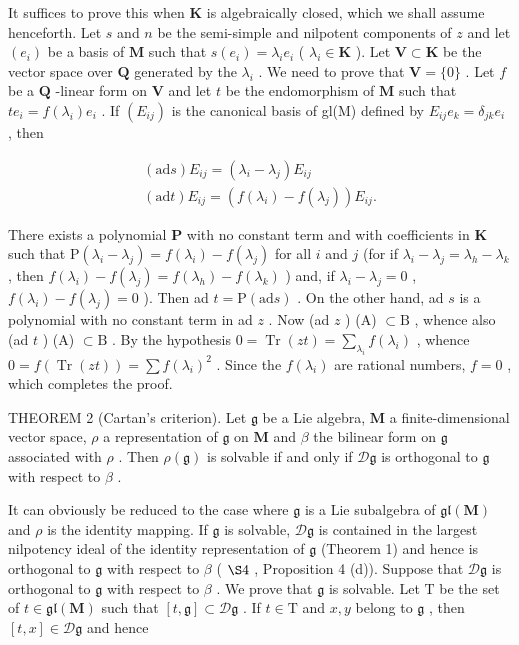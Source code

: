 It suffices to prove this when \(\mathbf{K}\) is algebraically closed, which we shall assume henceforth. Let \(s\) and \(n\) be the semi-simple and nilpotent components of \(z\) and let \((e_i)\) be a basis of \(\mathbf{M}\) such that \(s(e_i) = \lambda_i e_i\) ( \(\lambda_i \in \mathbf{K}\) ). Let \(\mathbf{V} \subset \mathbf{K}\) be the vector space over \(\mathbf{Q}\) generated by the \(\lambda_i\) . We need to prove that \(\mathbf{V} = \{0\}\) . Let \(f\) be a \(\mathbf{Q}\) -linear form on \(\mathbf{V}\) and let \(t\) be the endomorphism of \(\mathbf{M}\) such that \(te_{i}=f(\lambda_{i})e_{i}\) . If \((E_{ij})\) is the canonical basis of gl(M) defined by \(E_{ij}e_{k}=\delta_{jk}e_{i}\) , then

\[
\begin{array}{l} (\mathrm{ad} s) E _ {i j} = (\lambda_ {i} - \lambda_ {j}) E _ {i j} \\ (\mathrm{ad} t) E _ {i j} = (f (\lambda_ {i}) - f (\lambda_ {j})) E _ {i j}. \end{array}
\]

There exists a polynomial \(\mathbf{P}\) with no constant term and with coefficients in \(\mathbf{K}\) such that \(\mathrm{P}(\lambda_i - \lambda_j) = f(\lambda_i) - f(\lambda_j)\) for all \(i\) and \(j\) (for if \(\lambda_i - \lambda_j = \lambda_h - \lambda_k\) , then \(f(\lambda_i) - f(\lambda_j) = f(\lambda_h) - f(\lambda_k)\) ) and, if \(\lambda_i - \lambda_j = 0\) , \(f(\lambda_i) - f(\lambda_j) = 0\) ). Then ad \(t = \mathrm{P}(\mathrm{ad}s)\) . On the other hand, ad \(s\) is a polynomial with no constant term in ad \(z\) . Now (ad \(z\) ) (A) \(\subset \mathrm{B}\) , whence also (ad \(t\) ) (A) \(\subset \mathrm{B}\) . By the hypothesis \(0 = \operatorname{Tr}(zt) = \sum_{\lambda_i} f(\lambda_i)\) , whence \(0 = f(\operatorname{Tr}(zt)) = \sum f(\lambda_i)^2\) . Since the \(f(\lambda_i)\) are rational numbers, \(f = 0\) , which completes the proof.

THEOREM 2 (Cartan's criterion). Let \(\mathfrak{g}\) be a Lie algebra, \(\mathbf{M}\) a finite-dimensional vector space, \(\rho\) a representation of \(\mathfrak{g}\) on \(\mathbf{M}\) and \(\beta\) the bilinear form on \(\mathfrak{g}\) associated with \(\rho\) . Then \(\rho(\mathfrak{g})\) is solvable if and only if \(\mathcal{D}\mathfrak{g}\) is orthogonal to \(\mathfrak{g}\) with respect to \(\beta\) .

It can obviously be reduced to the case where \(\mathfrak{g}\) is a Lie subalgebra of \(\mathfrak{gl}(\mathbf{M})\) and \(\rho\) is the identity mapping. If \(\mathfrak{g}\) is solvable, \(\mathcal{D}\mathfrak{g}\) is contained in the largest nilpotency ideal of the identity representation of \(\mathfrak{g}\) (Theorem 1) and hence is orthogonal to \(\mathfrak{g}\) with respect to \(\beta\) ( \(\S 4\) , Proposition 4 (d)). Suppose that \(\mathcal{D}\mathfrak{g}\) is orthogonal to \(\mathfrak{g}\) with respect to \(\beta\) . We prove that \(\mathfrak{g}\) is solvable. Let \(\mathrm{T}\) be the set of \(t\in \mathfrak{gl}(\mathbf{M})\) such that \([t,\mathfrak{g}]\subset \mathcal{D}\mathfrak{g}\) . If \(t\in \mathrm{T}\) and \(x,y\) belong to \(\mathfrak{g}\) , then \([t,x]\in \mathcal{D}\mathfrak{g}\) and hence

